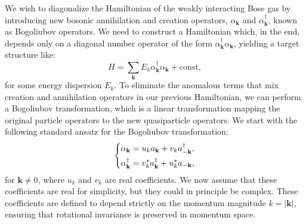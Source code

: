 We wish to diagonalize the Hamiltonian of the weakly interacting Bose gas by introducing new bosonic annihilation and creation operators, \( \alpha_{\mathbf{k}} \) and \( \alpha_{\mathbf{k}}^\dagger \), known as Bogoliubov operators. We need to construct a Hamiltonian which, in the end, depends only on a diagonal number operator of the form \( \alpha_{\mathbf{k}}^\dagger \alpha_{\mathbf{k}} \), yielding a target structure like:
\[
    H = \sum_{\mathbf{k}} E_k \alpha_{\mathbf{k}}^\dagger \alpha_{\mathbf{k}} + \text{const},
\]
for some energy dispersion \( E_k \). To eliminate the anomalous terms that mix creation and annihilation operators in our previous Hamiltonian, we can perform a Bogoliubov transformation, which is a linear transformation mapping the original particle operators to the new quasiparticle operators. We start with the following standard ansatz for the Bogoliubov transformation:
\begin{equation} \label{eq:bogoliubov_ansatz}
    \begin{dcases}
        \alpha_{\mathbf{k}} = u_k a_{\mathbf{k}} + v_k a_{-\mathbf{k}}^\dagger, \\
        \alpha_{\mathbf{k}}^\dagger = v_k^* a_{\mathbf{k}}^\dagger + u_k^* a_{-\mathbf{k}},
    \end{dcases}
\end{equation}
for \( \mathbf{k} \neq 0 \), where \( u_k \) and \( v_k \) are real coefficients. We now assume that these coefficients are real for simplicity, but they could in principle be complex.
These coefficients are defined to depend strictly on the momentum magnitude \( k = |\mathbf{k}| \), ensuring that rotational invariance is preserved in momentum space.

